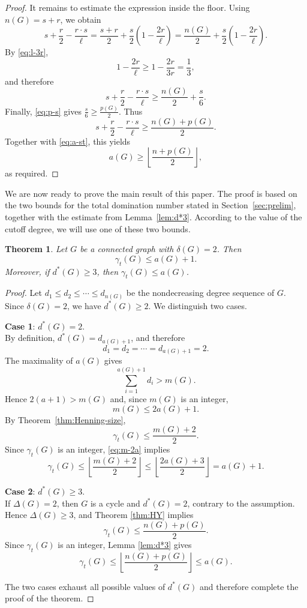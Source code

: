 \documentclass[12pt]{article}
\newtheorem{theorem}{Theorem}
\begin{document}
\begin{proof}
It remains to estimate the expression inside the floor. Using $n(G)=s+r$, we obtain
$$s+\frac r2-\frac{r \cdot s}{\ell}=\frac{s+r}{2}+\frac{s}{2}\left(1-\frac{2r}{\ell}\right)=\frac{n(G)}{2}+\frac{s}{2}\left(1-\frac{2r}{\ell}\right).$$
By \eqref{eq:l-3r},
$$1-\frac{2r}{\ell}\ge 1-\frac{2r}{3r}=\frac{1}{3},$$
and therefore
$$s+\frac r2-\frac{r \cdot s}{\ell}\ge \frac {n(G)}{2}+\frac{s}{6}.$$
Finally, \eqref{eq:p-s} gives $\frac{s}{6}\ge \frac{p(G)}{2}$. Thus
$$s+\frac{r}{2}-\frac{r \cdot s}{\ell} \ge \frac{n(G)+p(G)}{2}.$$
Together with \eqref{eq:a-st}, this yields
$$a(G)\ge\left\lfloor\frac{n+p(G)}2\right\rfloor,$$
as required.
\end{proof}

\medskip

We are now ready to prove the main result of this paper. The proof is based on the two bounds for the total domination number stated in Section~\ref{sec:prelim}, together with the estimate from Lemma~\ref{lem:d*3}. According to the value of the cutoff degree, we will use one of these two bounds.

\begin{theorem}\label{thm:main}
Let $G$ be a connected graph with $\delta(G)=2$. Then
$$\gamma_t(G)\le a(G)+1.$$
Moreover, if $d^*(G)\ge3$, then $\gamma_t(G)\le a(G)$.
\end{theorem}

\begin{proof}
Let
$d_1\le d_2\le\cdots\le d_{n(G)}$
be the nondecreasing degree sequence of $G$. Since $\delta(G)=2$, we have $d^*(G)\ge 2$. We distinguish two cases.

\medskip
\noindent
{\bf Case 1}: $d^*(G)=2$.\\
By definition, $d^*(G)=d_{a(G)+1}$, and therefore
$$d_1=d_2=\cdots=d_{a(G)+1}=2.$$
The maximality of $a(G)$ gives
$$\sum_{i=1}^{a(G)+1}d_i>m(G).$$
Hence $2(a+1)>m(G)$ and, since $m(G)$ is an integer,
\begin{equation}\label{eq:m-2a}
m(G)\le 2a(G)+1.
\end{equation}
By Theorem~\ref{thm:Henning-size},
$$\gamma_t(G)\le\frac{m(G)+2}{2}.$$
Since $\gamma_t(G)$ is an integer, \eqref{eq:m-2a} implies
$$\gamma_t(G)\le \left\lfloor\frac{m(G)+2}{2}\right\rfloor \le \left\lfloor\frac{2a(G)+3}{2}\right\rfloor =a(G)+1.$$

\medskip
\noindent
{\bf Case 2}: $d^*(G)\ge3$. \\
If $\Delta(G)=2$, then $G$ is a cycle and $d^*(G)=2$, contrary to the assumption. Hence $\Delta(G)\ge 3$, and Theorem \ref{thm:HY} implies
$$\gamma_t(G)\le \frac{n(G)+p(G)}{2}.$$
Since $\gamma_t(G)$ is an integer, Lemma \ref{lem:d*3} gives
$$\gamma_t(G)\le \left\lfloor\frac{n(G)+p(G)}2\right\rfloor\le a(G).$$

The two cases exhaust all possible values of $d^*(G)$ and therefore complete the proof of the theorem.
\end{proof}
\end{document}
